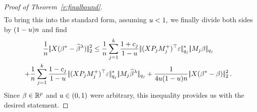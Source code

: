 \documentclass[bj]{imsart}
\newcommand{\normtwo}[1]{\ensuremath{\!|\!| #1 | \! |_{2}}}
\newcommand{\normqj}[1]{\ensuremath{\!|\!| #1 | \! |_{q_j}}}
\newcommand{\normqjd}[1]{\ensuremath{\!|\!| #1 | \! |_{q_j}^*}}
\newcommand{\1}{{\rm 1}\mskip -4,5mu{\rm l} }
\def\R{\mathbb{R}}
\newcommand{\betatrue}{\beta^*}
\newcommand{\genbeta}{\textcolor{black}{\beta}}
\newcommand{\genconstant}{\textcolor{black}{\ensuremath{u}}}
\begin{document}
\begin{proof}[Proof of Theorem~\ref{r:finalbound}]
\begin{multline*}
\end{multline*}
To bring this into the standard form, assuming $\genconstant<1,$ we finally divide both sides by $(1-\genconstant)n$ and find
\begin{multline*}
\frac{1}{n}\,\normtwo{\design(\betatrue-\estimatort)}^2\le \frac{1}{n}\sum_{j=1}^{\numbergroups}\frac{1+\tuningrelax_j}{1-\genconstant}\,  \normqjd{(\design  \projectionmatrix_j\fusedmatrix_j^{+})^\top\noise}  \, \normqj{\fusedmatrix_j \genbeta}\\+\frac{1}{n}\sum_{j=1}^{\numbergroups}\frac{1-\tuningrelax_j}{1-\genconstant}\, \normqjd{(\design  \projectionmatrix_j\fusedmatrix_j^{+})^\top\noise} \,  \normqj{\fusedmatrix_j \estimatort}+\frac{1}{4\genconstant(1-\genconstant)n}\,\normtwo{\design(\betatrue-\genbeta)}^2\,.
\end{multline*}
Since $\genbeta\in\R^p$ and $\genconstant\in(0,1)$ were arbitrary, this inequality provides us with the desired statement.\label{page:last}

\end{proof}
\end{document}
